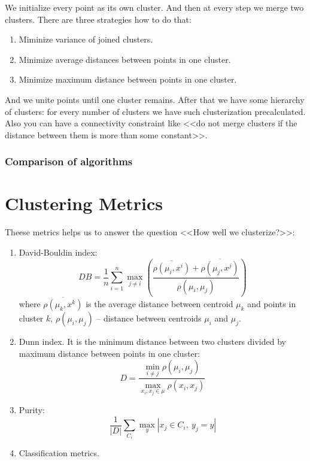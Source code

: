 We initialize every point as its own cluster. And then at every step we merge two clusters. There are three strategies how to do that:
\begin{enumerate}
	\item Miminize variance of joined clusters.
	\item Minimize average distances between points in one cluster.
	\item Minimize maximum distance between points in one cluster.
\end{enumerate}
And we unite points until one cluster remains. After that we have some hierarchy of clusters: for every number of clusters we have such clusterization precalculated.\\
Also you can have a connectivity constraint like <<do not merge clusters if the distance between them is more than some constant>>.

\subsubsection*{Comparison of algorithms}

\section{Clustering Metrics}

Theese metrics helps us to answer the question <<How well we clusterize?>>:
\begin{enumerate}
	\item David-Bouldin index: $$DB=\frac{1}{n}\sum\limits_{i=1}^{n}\max\limits_{j\ne i}\left(\frac{\overline{\rho(\mu_i,x^i)}+\overline{\rho(\mu_j,x^j)}}{\rho(\mu_i,\mu_j)}\right)$$ where $\overline{\rho(\mu_k,x^k)}$ is the average distance between centroid $\mu_k$ and points in cluster $k$, $\rho(\mu_i,\mu_j)$ -- distance between centroids $\mu_i$ and $\mu_j$.
	\item Dunn index. It is the minimum distance between two clusters divided by maximum distance between points in one cluster: $$D=\frac{\min_{i\ne j}\rho(\mu_i,\mu_j)}{\max\limits_{x_i,x_j\in\mu}\rho(x_i,x_j)}$$
	\item Purity: $$\frac{1}{|D|}\sum\limits_{C_i}\max\limits_{y}|x_j\in C_i,\ y_j=y|$$
	\item Classification metrics.
\end{enumerate}

